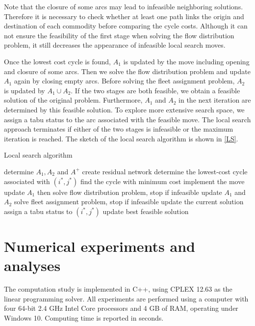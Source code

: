 \documentclass[11pt,nonblindrev,fleqn]{article}
\begin{document}
Note that the closure of some arcs may lead to infeasible neighboring solutions. Therefore it is necessary to check whether at least one path links the origin and destination of each commodity before comparing the cycle costs. Although it can not ensure the feasibility of the first stage when solving the flow distribution problem, it still decreases the appearance of infeasible local search moves.

Once the lowest cost cycle is found, $A_1$ is updated by the move including opening and closure of some arcs. Then we solve the flow distribution problem and update $A_1$ again by closing empty arcs. Before solving the fleet assignment problem, $A_2$ is updated by $A_1 \cup A_2$. If the two stages are both feasible, we obtain a feasible solution of the original problem. Furthermore, $A_1$ and $A_2$ in the next iteration are determined by this feasible solution. To explore more extensive search space, we assign a tabu status to the arc associated with the feasible move. The local search approach terminates if either of the two stages is infeasible or the maximum iteration is reached. The sketch of the local search algorithm is shown in \autoref{LS}.

\vspace{.25in}
\begin{algorithm}[H]
\caption{Local search algorithm}\label{LS}
\LinesNumbered
\SetNlSkip{1.2em}
{
    determine $A_1,A_2$ and $A^+$\;
    {
        create residual network\;
        determine the lowest-cost cycle associated with $(i^*,j^*)$\;
    }
    find the cycle with minimum cost\;
    implement the move\;
    update $A_1$ then solve flow distribution problem, stop if infeasible\;
    update $A_1$ and $A_2$\;
    solve fleet assignment problem, stop if infeasible\;
    update the current solution\;
    assign a tabu status to $(i^*,j^*)$\;
    {
        update best feasible solution\;
    }
}
\end{algorithm}

\section{Numerical experiments and analyses}\label{experiment}
The computation study is implemented in C++, using CPLEX 12.63 as the linear programming solver. All experiments are performed using a computer with four 64-bit 2.4 GHz Intel Core processors and 4 GB of RAM, operating under Windows 10. Computing time is reported in seconds.
\end{document}
